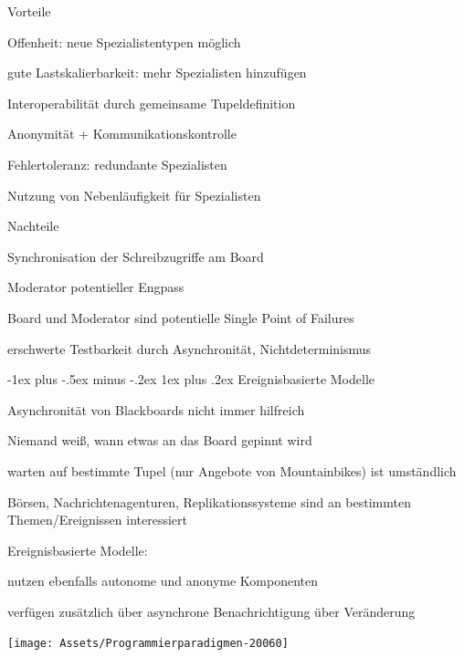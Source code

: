 \documentclass[10pt]{article}
\makeatletter
\renewcommand{\subsubsection}{\@startsection{subsubsection}{3}{0mm}%
                                {-1ex plus -.5ex minus -.2ex}%
                                {1ex plus .2ex}%
                                {\normalfont\small\bfseries}}
\makeatother
\begin{document}
\begin{itemize*}
  \item Vorteile
  \begin{itemize*}
    \item Offenheit: neue Spezialistentypen möglich
    \item gute Lastskalierbarkeit: mehr Spezialisten hinzufügen
    \item Interoperabilität durch gemeinsame Tupeldefinition
    \item Anonymität + Kommunikationskontrolle
    \item Fehlertoleranz: redundante Spezialisten
    \item Nutzung von Nebenläufigkeit für Spezialisten
  \end{itemize*}
  \item Nachteile
  \begin{itemize*}
    \item Synchronisation der Schreibzugriffe am Board
    \item Moderator potentieller Engpass
    \item Board und Moderator sind potentielle Single Point of Failures
    \item erschwerte Testbarkeit durch Asynchronität, Nichtdeterminismus
  \end{itemize*}
\end{itemize*}

\subsubsection{Ereignisbasierte Modelle}
\begin{itemize*}
  \item Asynchronität von Blackboards nicht immer hilfreich
  \begin{itemize*}
    \item Niemand weiß, wann etwas an das Board gepinnt wird
    \item warten auf bestimmte Tupel (nur Angebote von Mountainbikes) ist umständlich
  \end{itemize*}
  \item Börsen, Nachrichtenagenturen, Replikationssysteme sind an bestimmten Themen/Ereignissen interessiert
  \item Ereignisbasierte Modelle:
  \begin{itemize*}
    \item nutzen ebenfalls autonome und anonyme Komponenten
    \item verfügen zusätzlich über asynchrone Benachrichtigung über Veränderung
  \end{itemize*}
\end{itemize*}
\begin{center}
  \centering
  \texttt{[image: Assets/Programmierparadigmen-20060]}
\end{center}
\end{document}
